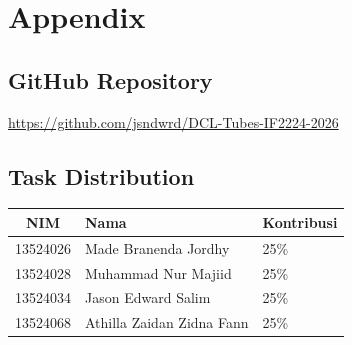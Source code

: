 \documentclass[11pt,a4paper]{article}
\begin{document}
\newpage
\section*{Appendix}

\subsection*{GitHub Repository}

\url{https://github.com/jsndwrd/DCL-Tubes-IF2224-2026}

\subsection*{Task Distribution}

\begin{table}[H]
    \centering
    \begin{tabularx}{\textwidth}{clX}
        \toprule
        \textbf{NIM} & \textbf{Nama} & \textbf{Kontribusi} \\
        \midrule
            13524026 & Made Branenda Jordhy      & 25\% \\
            13524028 & Muhammad Nur Majiid       & 25\% \\
            13524034 & Jason Edward Salim        & 25\% \\
            13524068 & Athilla Zaidan Zidna Fann & 25\% \\
        \bottomrule
    \end{tabularx}
\end{table}
\end{document}
